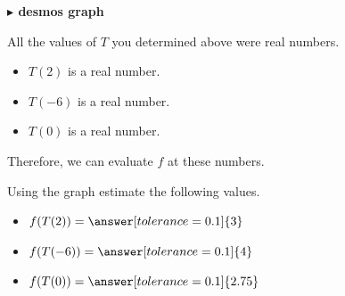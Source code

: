 \documentclass{ximera}
\begin{document}
\begin{onlineOnly}
\textbf{\textcolor{blue!55!black}{$\blacktriangleright$ desmos graph}} 
\begin{center}
\end{center}
\end{onlineOnly}






All the values of $T$ you determined above were real numbers. 


\begin{itemize}
\item $T(2)$ is a real number.  
\item $T(-6)$ is a real number. 
\item $T(0)$ is a real number.  
\end{itemize}


Therefore, we can evaluate $f$ at these numbers.


\begin{question}


Using the graph estimate the following values.


\begin{itemize}

\item $f(T(2)) = \answer[tolerance=0.1]{3}$ 

\item $f(T(-6)) = \answer[tolerance=0.1]{4}$ 

\item $f(T(0)) = \answer[tolerance=0.1]{2.75}$ 

\end{itemize}


\end{question}
\end{document}
